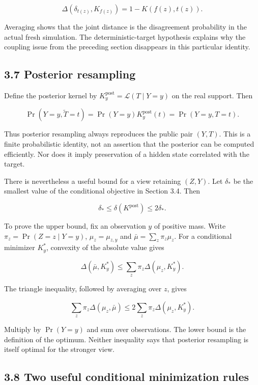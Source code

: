 \documentclass[
]{article}
\begin{document}
\[
\Delta(\delta_{t(z)},K_{f(z)})=1-K(f(z),t(z)).
\]

Averaging shows that the joint distance is the disagreement probability
in the actual fresh simulation. The deterministic-target hypothesis
explains why the coupling issue from the preceding section disappears in
this particular identity.

\subsection{3.7 Posterior resampling}\label{posterior-resampling}

Define the posterior kernel by
\(K_y^{\mathrm{post}}=\mathcal L(T\mid Y=y)\) on the real support. Then

\[
\Pr(Y=y,\widetilde T=t)=\Pr(Y=y)K_y^{\mathrm{post}}(t)
=\Pr(Y=y,T=t).
\]

Thus posterior resampling always reproduces the public pair \((Y,T)\).
This is a finite probabilistic identity, not an assertion that the
posterior can be computed efficiently. Nor does it imply preservation of
a hidden state correlated with the target.

There is nevertheless a useful bound for a view retaining \((Z,Y)\). Let
\(\delta_*\) be the smallest value of the conditional objective in
Section 3.4. Then

\[
\delta_*\le\delta(K^{\mathrm{post}})\le2\delta_*.
\]

To prove the upper bound, fix an observation \(y\) of positive mass.
Write \(\pi_z=\Pr(Z=z\mid Y=y)\), \(\mu_z=\mu_{z,y}\) and
\(\bar\mu=\sum_z\pi_z\mu_z\). For a conditional minimizer \(K_y^*\),
convexity of the absolute value gives

\[
\Delta(\bar\mu,K_y^*)\le\sum_z\pi_z\Delta(\mu_z,K_y^*).
\]

The triangle inequality, followed by averaging over \(z\), gives

\[
\sum_z\pi_z\Delta(\mu_z,\bar\mu)
\le2\sum_z\pi_z\Delta(\mu_z,K_y^*).
\]

Multiply by \(\Pr(Y=y)\) and sum over observations. The lower bound is
the definition of the optimum. Neither inequality says that posterior
resampling is itself optimal for the stronger view.

\subsection{3.8 Two useful conditional minimization
rules}\label{two-useful-conditional-minimization-rules}
\end{document}
